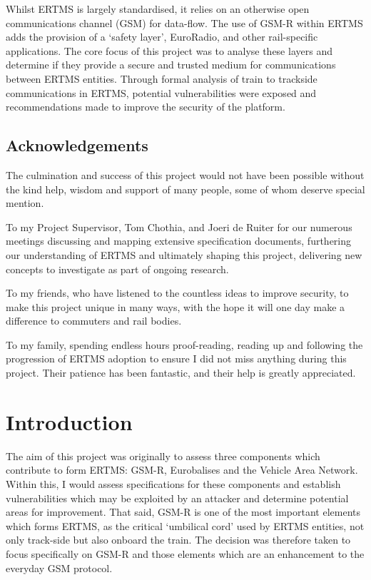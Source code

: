 \documentclass[twoside,11pt,a4paper]{article}
\begin{document}
Whilst ERTMS is largely standardised, it relies on an otherwise open communications channel (GSM) for data-flow. The use of GSM-R within ERTMS adds the provision of a `safety layer', EuroRadio, and other rail-specific applications. The core focus of this project was to analyse these layers and determine if they provide a secure and trusted medium for communications between ERTMS entities. Through formal analysis of train to trackside communications in ERTMS, potential vulnerabilities were exposed and recommendations made to improve the security of the platform.

\subsection{Acknowledgements}
The culmination and success of this project would not have been possible without the kind help, wisdom and support of many people, some of whom deserve special mention.

To my Project Supervisor, Tom Chothia, and Joeri de Ruiter for our numerous meetings discussing and mapping extensive specification documents, furthering our understanding of ERTMS and ultimately shaping this project, delivering new concepts to investigate as part of ongoing research.

To my friends, who have listened to the countless ideas to improve security, to make this project unique in many ways, with the hope it will one day make a difference to commuters and rail bodies.

To my family, spending endless hours proof-reading, reading up and following the progression of ERTMS adoption to ensure I did not miss anything during this project. Their patience has been fantastic, and their help is greatly appreciated.


\clearpage
\section{Introduction}
The aim of this project was originally to assess three components which contribute to form ERTMS: GSM-R, Eurobalises and the Vehicle Area Network. Within this, I would assess specifications for these components and establish vulnerabilities which may be exploited by an attacker and determine potential areas for improvement. That said, GSM-R is one of the most important elements which forms ERTMS, as the critical `umbilical cord' used by ERTMS entities, not only track-side but also onboard the train. The decision was therefore taken to focus specifically on GSM-R and those elements which are an enhancement to the everyday GSM protocol.
\end{document}
